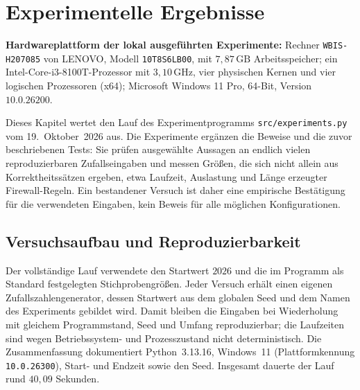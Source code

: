 \documentclass[a4paper,12pt, twoside]{report}
\theoremstyle{definition}
\newcommand{\experimenthardware}{%
	\par\smallskip\noindent
	\textbf{Hardwareplattform der lokal ausgeführten Experimente:} Rechner \texttt{WBIS-H207085} von LENOVO, Modell \texttt{10T8S6LB00}, mit $7{,}87\,\mathrm{GB}$ Arbeitsspeicher; ein Intel-Core-i3-8100T-Prozessor mit $3{,}10\,\mathrm{GHz}$, vier physischen Kernen und vier logischen Prozessoren (x64); Microsoft Windows 11 Pro, 64-Bit, Version $10.0.26200$.
	\par\smallskip}
\begin{document}
\chapter{Experimentelle Ergebnisse}
\label{sec:experimentelle-ergebnisse}

\experimenthardware

Dieses Kapitel wertet den Lauf des Experimentprogramms \texttt{src/experiments.py} vom 19.~Oktober~2026 aus. Die Experimente ergänzen die Beweise und die zuvor beschriebenen Tests: Sie prüfen ausgewählte Aussagen an endlich vielen reproduzierbaren Zufallseingaben und messen Größen, die sich nicht allein aus Korrektheitssätzen ergeben, etwa Laufzeit, Auslastung und Länge erzeugter Firewall-Regeln. Ein bestandener Versuch ist daher eine empirische Bestätigung für die verwendeten Eingaben, kein Beweis für alle möglichen Konfigurationen.

\section{Versuchsaufbau und Reproduzierbarkeit}

Der vollständige Lauf verwendete den Startwert $2026$ und die im Programm als Standard festgelegten Stichprobengrößen. Jeder Versuch erhält einen eigenen Zufallszahlengenerator, dessen Startwert aus dem globalen Seed und dem Namen des Experiments gebildet wird. Damit bleiben die Eingaben bei Wiederholung mit gleichem Programmstand, Seed und Umfang reproduzierbar; die Laufzeiten sind wegen Betriebssystem- und Prozesszustand nicht deterministisch. Die Zusammenfassung dokumentiert Python~3.13.16, Windows~11 (Plattformkennung \texttt{10.0.26300}), Start- und Endzeit sowie den Seed. Insgesamt dauerte der Lauf rund $40{,}09$ Sekunden.
\end{document}
